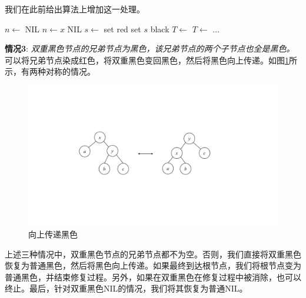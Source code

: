 \documentclass[b5paper]{ctexart}
\begin{document}
我们在此前给出算法上增加这一处理。

\begin{algorithmic}[1]
  \State $n \gets$ NIL
    
    \State $n \gets x$
  \EndIf
   
    \State \Return NIL
  \EndIf
        \State $s \gets$ 
           
          \State set  red
          \State set $s$ black
           
            \State $T \gets$ 
          \Else {}
            \State $T \gets$ 
          \EndIf
          \State ...
        \EndIf
    \EndIf
  \EndWhile
\EndFunction
\end{algorithmic}

\textbf{情况3}: {\em 双重黑色节点的兄弟节点为黑色，该兄弟节点的两个子节点也全是黑色。}可以将兄弟节点染成红色，将双重黑色变回黑色，然后将黑色向上传递。如图\cref{fig:del-case3}所示，有两种对称的情况。

\begin{figure}[htbp]
  \centering
  \includegraphics[scale=0.4, page=5]{../../../datastruct/tree/red-black-tree/img/rbtree}
  \caption{向上传递黑色}
  \label{fig:del-case3}

\end{figure}

上述三种情况中，双重黑色节点的兄弟节点都不为空。否则，我们直接将双重黑色恢复为普通黑色，然后将黑色向上传递。如果最终到达根节点，我们将根节点变为普通黑色，并结束修复过程。另外，如果在双重黑色在修复过程中被消除，也可以终止。最后，针对双重黑色NIL的情况，我们将其恢复为普通NIL。
\end{document}
